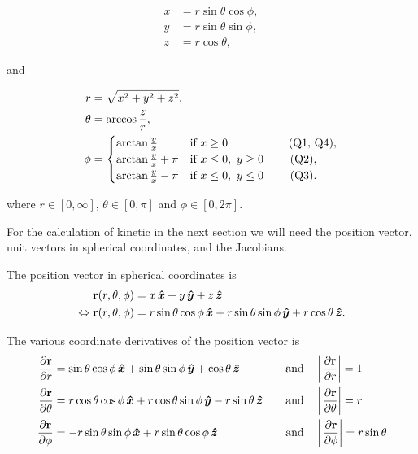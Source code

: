 \begin{align}
    x &= r \sin{\theta}\cos{\phi}, \label{eq:x(q)} \\
    y &= r \sin{\theta}\sin{\phi}, \label{eq:y(q)}\\
    z &= r \cos{\theta}, \label{eq:z(q)}
\end{align}

and

\begin{align}
    r &= \sqrt{x^2 + y^2 + z^2}, \label{eq:r(x,y,z)}\\
    \theta &= \arccos{\frac{z}{r}}, \label{eq:theta(x,y,z)}\\
    \phi &= 
    \begin{cases}
    \arctan{\frac{y}{x}} & \text{if \(x \geq 0\) \qquad \qquad \ \ \ (Q1, Q4),}
    \\
    \arctan{\frac{y}{x}}+\pi & \text{if \(x \leq 0,\ y \geq 0\) \qquad (Q2),}
    \\
    \arctan{\frac{y}{x}}-\pi & \text{if \(x \leq 0,\ y \leq 0\) \qquad (Q3).}
    \end{cases} \label{eq:phi(x,y,z)}
\end{align}

where \(r \in [0, \infty]\), \(\theta \in [0, \pi]\) and \(\phi \in [0, 2\pi]\).

For the calculation of kinetic in the next section we will need the position vector, unit vectors in spherical coordinates, and the Jacobians.

The position vector in spherical coordinates is
\begin{align}
    \mathbf{r}(r, \theta, \phi) &= x \operatorname{}\!\bm{\hat{x}} + y \operatorname{}\!\bm{\hat{y}} + z \operatorname{}\!\bm{\hat{z}} \\
    \Leftrightarrow \mathbf{r}(r, \theta, \phi) &= r \sin{\theta}\cos{\phi} \operatorname{}\!\bm{\hat{x}} + r \sin{\theta}\sin{\phi} \operatorname{}\!\bm{\hat{y}} + r \cos{\theta} \operatorname{}\!\bm{\hat{z}}. \label{eq:position-vec-spherical}
\end{align}

The various coordinate derivatives of the position vector is
\begin{align}
    \pd{\vec{r}}{r} &= \sin{\theta}\cos{\phi} \xhat + \sin{\theta}\sin{\phi} \yhat + \cos{\theta} \zhat \quad &\text{and} \quad &\left| \pd{\vec{r}}{r} \right| = 1 \label{eq:position-derived-r} \\
    \pd{\vec{r}}{\theta} &= r \cos{\theta}\cos{\phi} \xhat + r \cos{\theta}\sin{\phi} \yhat - r \sin{\theta} \zhat \quad &\text{and} \quad &\left| \pd{\vec{r}}{\theta} \right| = r \label{eq:position-derived-theta} \\
    \pd{\vec{r}}{\phi} &= -r\sin{\theta}\sin{\phi} \xhat + r\sin{\theta}\cos{\phi} \zhat \quad &\text{and} \quad &\left| \pd{\vec{r}}{\phi} \right| = r\sin{\theta} \label{eq:position-derived-phi}
\end{align}

